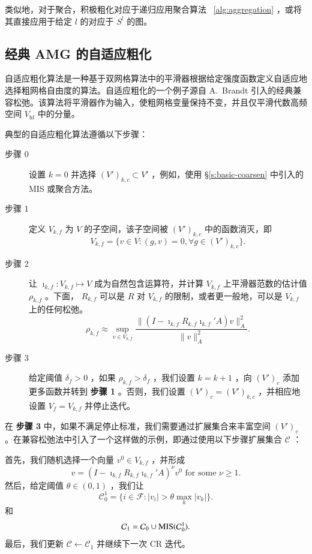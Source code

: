 \documentclass[12pt]{acta_2011xz}
\begin{document}
类似地，对于聚合，积极粗化对应于递归应用聚合算法~    \ref{alg:aggregation}   ，或将其直接应用于给定    $l$    的对应于    $S^l$    的图。  

   \subsection{经典 AMG 的自适应粗化  }    自适应粗化算法是一种基于双网格算法中的平滑器根据给定强度函数定义自适应地选择粗网格自由度的算法。自适应粗化的一个例子源自 A.~Brandt 引入的经典兼容松弛。该算法将平滑器作为输入，使粗网格变量保持不变，并且仅平滑代数高频空间    $V_{\text{hf}}$    中的分量。  

典型的自适应粗化算法遵循以下步骤：
   \begin{description}   \item    [步骤 0] 设置    $k=0$    并选择    $(V')_{k,c}\subset V'$    ，例如，使用    \S       \ref{s:basic-coarsen}    中引入的 MIS 或聚合方法。
   \item    [步骤 1] 定义
   $V_{k,f}$    为    $V$    的子空间，该子空间被    $(V')_{k,c}$    中的函数消灭，即
   \begin{equation*}
    V_{k, f}= \{ v\in V: (g, v) = 0, \forall g\in (V')_{k, c} \} .
\end{equation*}   
   \item    [步骤 2] 让    $\imath_{k, f}: V_{k,f} \mapsto V$    成为自然包含运算符，并计算    $V_{k,f}$    上平滑器范数的估计值    $\rho_{k,f}$    。下面，   $R_{k,f}$    可以是    $R$    对    $V_{k,f}$    的限制，或者更一般地，可以是    $V_{k,f}$    上的任何松弛。
   \begin{equation*}
        \rho_{k, f}\approx \sup_{v\in V_{k,f}}
        \frac{\|(I-\imath_{k,f}R_{k,f} \imath_{k,f}'A )v\|_A^2}{\|v\|_A^2}.
    \end{equation*}    
   \item    [步骤 3] 给定阈值    $\delta_f>0$    ，如果 
   $\rho_{k,f} > \delta_f$    ，我们设置    $k=k+1$    ，向    $(V')_c$    添加更多函数并转到
 {    \bf    步骤 1   }  。否则，我们设置    $(V')_{c}  = (V')_{k,c}$    ，并相应地设置    $V_f = V_{k,f}$    并停止迭代。  \end{description}     

在  {    \bf    步骤 3   }  中，如果不满足停止标准，我们需要通过扩展集合来丰富空间    $(V')_c$    。在兼容松弛法中引入了一个这样做的示例，即通过使用以下步骤扩展集合    $\mathcal C$   ：  

首先，我们随机选择一个向量    $v^0\in V_{k,f}$    ，并形成
   $$
v=(I-\imath_{k,f}R_{k,f} \imath_{k,f}'A)^{\nu}v^0\mbox{ for some } \nu\ge 1.
$$    然后，给定阈值    $\theta \in (0, 1)$    ，我们让 
   \begin{equation*}
    \mathcal C_0^1= \{ i\in \mathcal F: |v_i|> \theta \max_{k}|v_k| \} .
\end{equation*}    和 
   $$
\mathcal C_1=\mathcal C_0\cup \mathcal {\rm MIS}(\mathcal C_0^{1}). 
$$    最后，我们更新    $\mathcal C\leftarrow \mathcal C_1$    并继续下一次 CR 迭代。  
\end{document}
